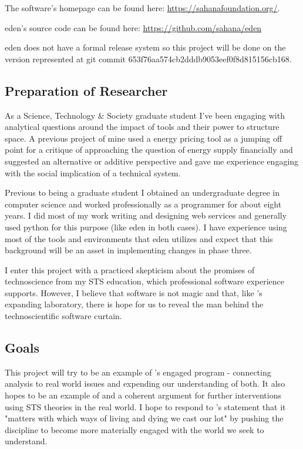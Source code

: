 \documentclass[a4paper,man,natbib]{apa6}
\begin{document}
   \begin{flushleft}
   The software's homepage can be found here: \url{https://sahanafoundation.org/}. \linebreak 

   \acrshort{eden}'s source code can be found here: \url{https://github.com/sahana/eden} \linebreak 

   \acrshort{eden} does not have a formal release system so this project will be done on the version represented at git commit 653f76aa574cb2dddb9053eef0f8d815156cb168.
   \end{flushleft}


   \subsection*{Preparation of Researcher}
   As a Science, Technology \& Society graduate student I've been engaging with analytical questions around the impact of tools and their power to structure space. A previous project of mine used a energy pricing tool as a jumping off point for a critique of approaching the question of energy supply financially and suggested an alternative or additive perspective and gave me experience engaging with the social implication of a technical system.

   Previous to being a graduate student I obtained an undergraduate degree in computer science and worked professionally as a programmer for about eight years. I did most of my work writing and designing web services and generally used python for this purpose (like \acrshort{eden} in both cases). I have experience using most of the tools and environments that \acrshort{eden} utilizes and expect that this background will be an asset in implementing changes in phase three.

   I enter this project with a practiced skepticism about the promises of technoscience from my STS education, which professional software experience supports. However, I believe that software is not magic and that, like \citet{Latour1983-bs}'s expanding laboratory, there is hope for us to reveal the man behind the technoscientific software curtain.

   \subsection*{Goals}

   This project will try to be an example of \citet{Sismondo2008-xz}'s engaged program - connecting analysis to real world issues and expending our understanding of both. It also hopes to be an example of and a coherent argument for further interventions using STS theories in the real world. I hope to respond to \citet[p.55]{Haraway2016-nc}'s statement that it "matters with which ways of living and dying we cast our lot" by pushing the discipline to become more materially engaged with the world we seek to understand.

   \printnoidxglossaries
   \setlength{\parindent}{4em}
   
\end{document}
